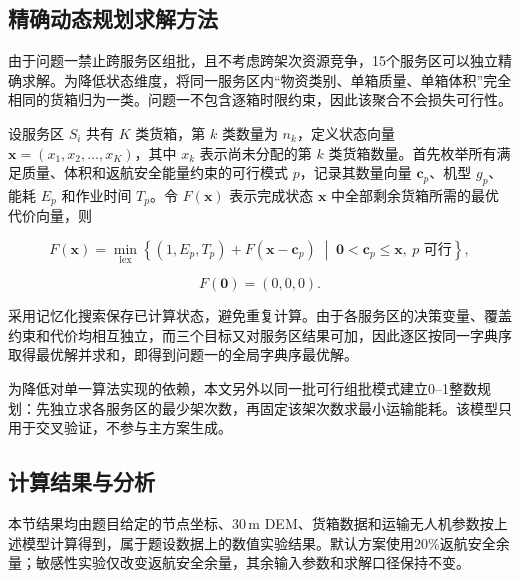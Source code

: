 \documentclass[bwprint,fontset=fandol]{gmcmthesis}
\begin{document}
\subsection{精确动态规划求解方法}
由于问题一禁止跨服务区组批，且不考虑跨架次资源竞争，15个服务区可以独立精确求解。为降低状态维度，将同一服务区内“物资类别、单箱质量、单箱体积”完全相同的货箱归为一类。问题一不包含逐箱时限约束，因此该聚合不会损失可行性。

设服务区 $S_i$ 共有 $K$ 类货箱，第 $k$ 类数量为 $n_k$，定义状态向量
$\boldsymbol{x}=(x_1,x_2,\ldots,x_K)$，其中 $x_k$ 表示尚未分配的第 $k$ 类货箱数量。首先枚举所有满足质量、体积和返航安全能量约束的可行模式 $p$，记录其数量向量 $\boldsymbol{c}_p$、机型 $g_p$、能耗 $E_p$ 和作业时间 $T_p$。令 $F(\boldsymbol{x})$ 表示完成状态 $\boldsymbol{x}$ 中全部剩余货箱所需的最优代价向量，则

\begin{equation}
F(\boldsymbol{x})=
\min_{\mathrm{lex}}\left\{
(1,E_p,T_p)+F(\boldsymbol{x}-\boldsymbol{c}_p)
\;\middle|\;
\boldsymbol{0}<\boldsymbol{c}_p\le\boldsymbol{x},\ p\text{ 可行}
\right\},
\label{eq:q1-dp}
\end{equation}

\begin{equation}
F(\boldsymbol{0})=(0,0,0).
\label{eq:q1-dp-initial}
\end{equation}

采用记忆化搜索保存已计算状态，避免重复计算。由于各服务区的决策变量、覆盖约束和代价均相互独立，而三个目标又对服务区结果可加，因此逐区按同一字典序取得最优解并求和，即得到问题一的全局字典序最优解。

为降低对单一算法实现的依赖，本文另外以同一批可行组批模式建立0--1整数规划：先独立求各服务区的最少架次数，再固定该架次数求最小运输能耗。该模型只用于交叉验证，不参与主方案生成。

\subsection{计算结果与分析}
本节结果均由题目给定的节点坐标、30\,m DEM、货箱数据和运输无人机参数按上述模型计算得到，属于题设数据上的数值实验结果。默认方案使用20\%返航安全余量；敏感性实验仅改变返航安全余量，其余输入参数和求解口径保持不变。
\end{document}
